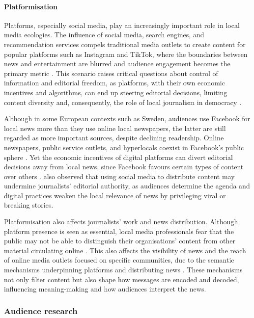 \documentclass[english]{textolivre}
\begin{document}
\paragraph{Platformisation}
Platforms, especially social media, play an increasingly important role in local media ecologies. The influence of social media, search engines, and recommendation services compels traditional media outlets to create content for popular platforms such as Instagram and TikTok, where the boundaries between news and entertainment are blurred and audience engagement becomes the primary metric \cite{hradziushka2022}. This scenario raises critical questions about control of information and editorial freedom, as platforms, with their own economic incentives and algorithms, can end up steering editorial decisions, limiting content diversity and, consequently, the role of local journalism in democracy \cite{fuchs2014social}.

Although in some European contexts such as Sweden, audiences use Facebook for local news more than they use online local newspapers, the latter are still regarded as more important sources, despite declining readership. Online newspapers, public service outlets, and hyperlocals coexist in Facebook’s public sphere \cite{nygren2019}. Yet the economic incentives of digital platforms can divert editorial decisions away from local news, since Facebook favours certain types of content over others \cite{toff2021}. \textcite{firmstone2021} also observed that using social media to distribute content may undermine journalists’ editorial authority, as audiences determine the agenda and digital practices weaken the local relevance of news by privileging viral or breaking stories.

Platformisation also affects journalists' work and news distribution. Although platform presence is seen as essential, local media professionals fear that the public may not be able to distinguish their organisations’ content from other material circulating online \cite{morais2023}. This also affects the visibility of news and the reach of online media outlets focused on specific communities, due to the semantic mechanisms underpinning platforms and distributing news \cite{ivancsics2023}. These mechanisms not only filter content but also shape how messages are encoded and decoded, influencing meaning-making and how audiences interpret the news.

\subsubsection{Audience research}
\end{document}
